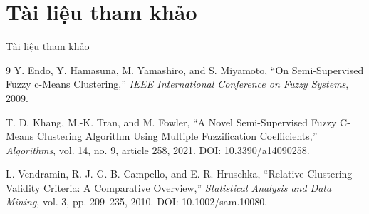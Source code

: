 \documentclass[t,aspectratio=169]{beamer}
\begin{document}
\section{Tài liệu tham khảo}
\useStyleLogoOnly

\begin{frame}{Tài liệu tham khảo}
  \small
  \begin{thebibliography}{9}
    Y. Endo, Y. Hamasuna, M. Yamashiro, and S. Miyamoto,
    ``On Semi-Supervised Fuzzy c-Means Clustering,''
    \emph{IEEE International Conference on Fuzzy Systems}, 2009.

    T. D. Khang, M.-K. Tran, and M. Fowler,
    ``A Novel Semi-Supervised Fuzzy C-Means Clustering Algorithm Using Multiple Fuzzification Coefficients,''
    \emph{Algorithms}, vol. 14, no. 9, article 258, 2021.
    DOI: 10.3390/a14090258.

    L. Vendramin, R. J. G. B. Campello, and E. R. Hruschka,
    ``Relative Clustering Validity Criteria: A Comparative Overview,''
    \emph{Statistical Analysis and Data Mining}, vol. 3, pp. 209--235, 2010.
    DOI: 10.1002/sam.10080.
  \end{thebibliography}
\end{frame}

\hidePageNumber
{}
\end{document}
